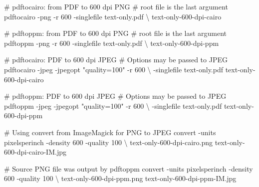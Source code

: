 \documentclass[
  11pt,
  british,
  a4paper,
]{article}
\newenvironment{Shaded}{\begin{snugshade}}{\end{snugshade}}
\newcommand{\AttributeTok}[1]{\textcolor[rgb]{0.80,0.80,0.80}{#1}}
\newcommand{\CommentTok}[1]{\textcolor[rgb]{0.50,0.62,0.50}{#1}}
\newcommand{\DataTypeTok}[1]{\textcolor[rgb]{0.87,0.87,0.75}{#1}}
\newcommand{\ExtensionTok}[1]{\textcolor[rgb]{0.80,0.80,0.80}{#1}}
\newcommand{\NormalTok}[1]{\textcolor[rgb]{0.80,0.80,0.80}{#1}}
\newcommand{\StringTok}[1]{\textcolor[rgb]{0.80,0.58,0.58}{#1}}
\begin{document}
\begin{Shaded}
\begin{Highlighting}[]
\CommentTok{\# \textasciigrave{}pdftocairo\textasciigrave{}: from PDF to 600 dpi PNG}
\CommentTok{\# root file is the last argument}
\ExtensionTok{pdftocairo} \AttributeTok{{-}png} \AttributeTok{{-}r}\NormalTok{ 600 }\AttributeTok{{-}singlefile}\NormalTok{ text{-}only.pdf }\DataTypeTok{\textbackslash{}}
\NormalTok{text{-}only{-}600{-}dpi{-}cairo}

\CommentTok{\# \textasciigrave{}pdftoppm\textasciigrave{}: from PDF to 600 dpi PNG}
\CommentTok{\# root file is the last argument}
\ExtensionTok{pdftoppm} \AttributeTok{{-}png} \AttributeTok{{-}r}\NormalTok{ 600 }\AttributeTok{{-}singlefile}\NormalTok{ text{-}only.pdf }\DataTypeTok{\textbackslash{}}
\NormalTok{text{-}only{-}600{-}dpi{-}ppm}

\CommentTok{\# \textasciigrave{}pdftocairo\textasciigrave{}: PDF to 600 dpi JPEG}
\CommentTok{\# Options may be passed to JPEG}
\ExtensionTok{pdftocairo} \AttributeTok{{-}jpeg} \AttributeTok{{-}jpegopt} \StringTok{"quality=100"} \AttributeTok{{-}r}\NormalTok{ 600 }\DataTypeTok{\textbackslash{}}
\NormalTok{{-}singlefile text{-}only.pdf text{-}only{-}600{-}dpi{-}cairo}

\CommentTok{\# \textasciigrave{}pdftoppm\textasciigrave{}: PDF to 600 dpi JPEG}
\CommentTok{\# Options may be passed to JPEG}
\ExtensionTok{pdftoppm} \AttributeTok{{-}jpeg} \AttributeTok{{-}jpegopt} \StringTok{"quality=100"} \AttributeTok{{-}r}\NormalTok{ 600 }\DataTypeTok{\textbackslash{}}
\NormalTok{{-}singlefile text{-}only.pdf text{-}only{-}600{-}dpi{-}ppm}

\CommentTok{\# Using \textasciigrave{}convert\textasciigrave{} from ImageMagick for PNG to JPEG}
\ExtensionTok{convert} \AttributeTok{{-}units}\NormalTok{ pixelsperinch }\AttributeTok{{-}density}\NormalTok{ 600 }\AttributeTok{{-}quality}\NormalTok{ 100 }\DataTypeTok{\textbackslash{}}
\NormalTok{text{-}only{-}600{-}dpi{-}cairo.png text{-}only{-}600{-}dpi{-}cairo{-}IM.jpg}

\CommentTok{\# Source PNG file was output by \textasciigrave{}pdftoppm\textasciigrave{} }
\ExtensionTok{convert} \AttributeTok{{-}units}\NormalTok{ pixelsperinch }\AttributeTok{{-}density}\NormalTok{ 600 }\AttributeTok{{-}quality}\NormalTok{ 100 }\DataTypeTok{\textbackslash{}}
\NormalTok{text{-}only{-}600{-}dpi{-}ppm.png text{-}only{-}600{-}dpi{-}ppm{-}IM.jpg}
\end{Highlighting}
\end{Shaded}
\end{document}

